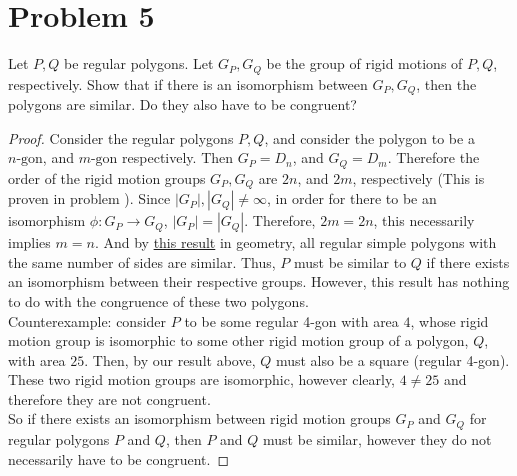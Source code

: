 \documentclass[hidelinks,12pt]{article}
\begin{document}
\section{Problem 5}Let $P,Q$ be regular polygons. Let $G_P, G_Q$ be the group of rigid motions of $P,Q$, respectively. Show that if there is an isomorphism between $G_P,G_Q$, then the polygons are similar. Do they also have to be congruent?\begin{proof}Consider the regular polygons $P,Q$, and consider the polygon to be a $n\text{-gon}$, and $m\text{-gon}$ respectively. Then $G_P=D_n$, and $G_Q=D_m$. Therefore the order of the rigid motion groups $G_P, G_Q$ are $2n$, and $2m$, respectively (This is proven in problem \color{magenta}{\ref{7}}\color{black}). Since $|G_P|, |G_Q|\neq\infty$, in order for there to be an isomorphism $\phi:G_P\to G_Q$, $|G_P|=|G_Q|$. Therefore, $2m=2n$, this necessarily implies $m=n$. And by \href{https://en.wikipedia.org/wiki/Regular_polygon#Regular_convex_polygons}{\color{cyan}this result} in geometry, all regular simple polygons with the same number of sides are similar. Thus, $P$ must be similar to $Q$ if there exists an isomorphism between their respective groups. 
However, this result has nothing to do with the congruence of these two polygons. \\

Counterexample: consider $P$ to be some regular 4-gon with area $4$, whose rigid motion group is isomorphic to some other rigid motion group of a polygon, $Q$, with area $25$. Then, by our result above, $Q$ must also be a square (regular 4-gon). These two rigid motion groups are isomorphic, however clearly, $4\neq25$ and therefore they are not congruent.\\

So if there exists an isomorphism between rigid motion groups $G_P$ and $G_Q$ for regular polygons $P$ and $Q$, then $P$ and $Q$ must be similar, however they do not necessarily have to be congruent.
\end{proof}
\end{document}
